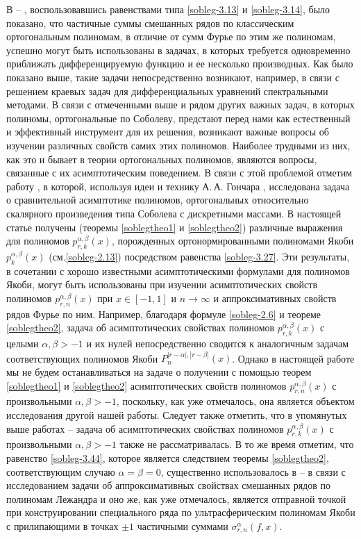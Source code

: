 В  \cite{Shar11} -- \cite{SHII}, воспользовавшись равенствами типа \eqref{sobleg-3.13} и \eqref{sobleg-3.14}, было показано, что частичные суммы смешанных рядов по классическим ортогональным полиномам, в отличие от сумм Фурье по этим же полиномам, успешно могут быть использованы в задачах, в которых требуется одновременно приближать дифференцируемую функцию и ее несколько производных. Как было показано выше, такие задачи непосредственно возникают, например, в связи с решением краевых задач для дифференциальных уравнений спектральными методами.
В связи с отмеченными выше и рядом других важных задач, в которых полиномы, ортогональные по Соболеву, предстают перед нами как естественный и эффективный инструмент для их решения, возникают важные вопросы об изучении различных  свойств самих этих полиномов. Наиболее трудными из них, как это и бывает в теории ортогональных полиномов, являются вопросы, связанные с их асимптотическим поведением.   В связи с этой проблемой  отметим  работу
\cite{Lopez1995}, в которой, используя  идеи и технику А.\,А. Гончара \cite{Gonchar1975}, исследована задача о сравнительной асимптотике полиномов, ортогональных относительно скалярного произведения типа  Соболева с дискретными массами.
В настоящей  статье получены (теоремы \ref{soblegtheo1} и \ref{soblegtheo2}) различные выражения для полиномов $p_{r,k}^{\alpha,\beta}(x)$, порожденных ортонормированными полиномами Якоби $p_{k}^{\alpha,\beta}(x)$ (см.\eqref{sobleg-2.13}) посредством  равенства \eqref{sobleg-3.27}. Эти результаты, в сочетании с  хорошо известными асимптотическими формулами для полиномов Якоби, могут быть использованы  при изучении асимптотических свойств полиномов $p_{r,n}^{\alpha,\beta}(x)$ при $x\in[-1,1]$ и $n\to\infty$ и аппроксимативных свойств рядов Фурье по ним. Например,  благодаря формуле \eqref{sobleg-2.6}  и теореме \ref{soblegtheo2}, задача об асимптотических свойствах полиномов $p_{r,k}^{\alpha,\beta}(x)$ с целыми $\alpha,\beta>-1$ и их нулей непосредственно сводится к аналогичным задачам соответствующих полиномов Якоби $P_n^{|r-\alpha|,|r-\beta|}(x)$.  Однако в настоящей работе мы не будем  останавливаться на задаче о получении с помощью теорем \ref{soblegtheo1} и \ref{soblegtheo2}  асимптотических свойств полиномов $p_{r,n}^{\alpha,\beta}(x)$ с произвольными $\alpha,\beta>-1$, поскольку, как уже отмечалось, она является объектом исследования другой нашей работы. Следует также отметить, что в упомянутых выше работах \cite{Shar11} -- \cite{SHII} задача об асимптотических свойствах полиномов $p_{r,k}^{\alpha,\beta}(x)$ с произвольными $\alpha,\beta>-1$ также не рассматривалась. В то же время отметим, что
равенство \eqref{sobleg-3.44}, которое является следствием теоремы \ref{soblegtheo2}, соответствующим случаю $\alpha=\beta=0$, существенно использовалось в \cite{Shar15} -- \cite{Shar17} в связи с исследованием задачи об аппроксимативных свойствах смешанных рядов по полиномам Лежандра и
оно же, как уже отмечалось,  является отправной точкой при конструировании специального ряда  по ультрасферическим полиномам Якоби с  прилипающими в точках $\pm1$ частичными суммами $\sigma_{r,n}^\alpha(f,x)$.

